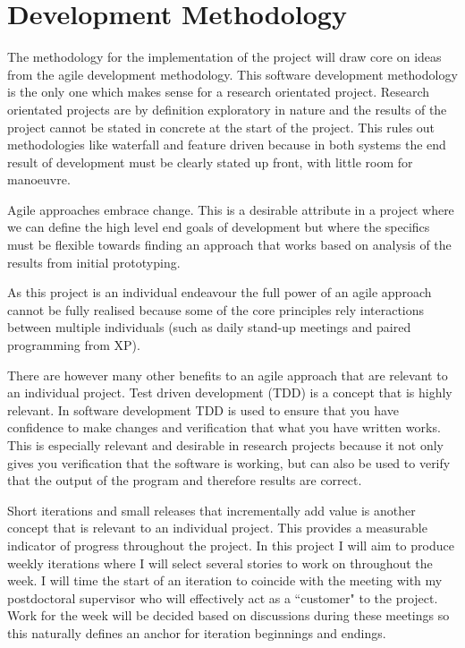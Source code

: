 \section{Development Methodology}
The methodology for the implementation of the project will draw core on ideas from the agile development methodology. This software development methodology is the only one which makes sense for a research orientated project. Research orientated projects are by definition exploratory in nature and the results of the project cannot be stated in concrete at the start of the project. This rules out methodologies like waterfall and feature driven because in both systems the end result of development must be clearly stated up front, with little room for manoeuvre.

Agile approaches embrace change. This is a desirable attribute in a project where we can define the high level end goals of development but where the specifics must be flexible towards finding an approach that works based on analysis of the results from initial prototyping.

As this project is an individual endeavour the full power of an agile approach cannot be fully realised because some of the core principles rely interactions between multiple individuals (such as daily stand-up meetings and paired programming from XP).

There are however many other benefits to an agile approach that are relevant to an individual project. Test driven development (TDD) is a concept that is highly relevant. In software development TDD is used to ensure that you have confidence to make changes and verification that what you have written works. This is especially relevant and desirable in research projects because it not only gives you verification that the software is working, but can also be used to verify that the output of the program and therefore results are correct.

Short iterations and small releases that incrementally add value is another concept that is relevant to an individual project. This provides a measurable indicator of progress throughout the project. In this project I will aim to produce weekly iterations where I will select several stories to work on throughout the week. I will time the start of an iteration to coincide with the meeting with my postdoctoral supervisor who will effectively act as a ``customer" to the project. Work for the week will be decided based on discussions during these meetings so this naturally defines an anchor for iteration beginnings and endings.

